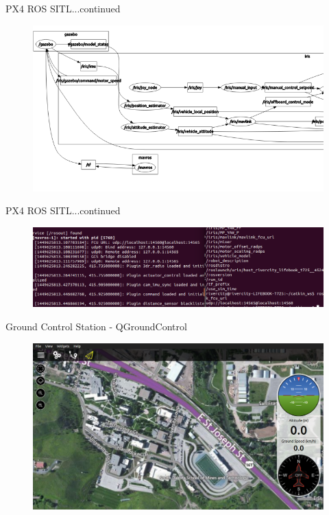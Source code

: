 \documentclass[11pt]{beamer}
\begin{document}
\begin{frame}{PX4 ROS SITL...continued}
\begin{figure}
\includegraphics[width=1\textwidth]{images/mavros_sitl}
\end{figure}
\end{frame}

\begin{frame}{PX4 ROS SITL...continued}
\begin{figure}
\includegraphics[width=1\textwidth]{images/params}
\end{figure}
\end{frame}

\begin{frame}{Ground Control Station - QGroundControl}
\begin{figure}
\includegraphics[width=1\textwidth]{images/qgroundcontrol}
\end{figure}
\end{frame}
\end{document}
